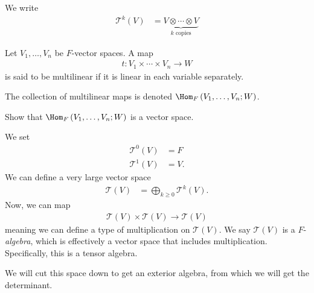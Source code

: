 \documentclass[10pt]{mypackage}
\begin{document}
  We write
  \begin{align*}
    \mathcal{T}^{k}\left(V\right) &= \underbrace{V\otimes \cdots \otimes V}_{\text{$k$ copies}}
  \end{align*}
  \begin{definition}
    Let $V_1,\dots,V_n$ be $F$-vector spaces. A map
    \begin{align*}
      t: V_1\times\cdots\times V_n\rightarrow W
    \end{align*}
    is said to be multilinear if it is linear in each variable separately.\newline

    The collection of multilinear maps is denoted $\Hom_{F}\left(V_1,\dots,V_n;W\right)$.
  \end{definition}
  \begin{exercise}
    Show that $\Hom_{F}\left(V_1,\dots,V_n;W\right)$ is a vector space.
  \end{exercise}
  We set
  \begin{align*}
    \mathcal{T}^{0}(V) &= F\\
    \mathcal{T}^{1}(V) &= V.
  \end{align*}
  We can define a very large vector space
  \begin{align*}
    \mathcal{T}(V) &= \bigoplus_{k\geq 0}\mathcal{T}^{k}(V).
  \end{align*}
  Now, we can map
  \begin{align*}
    \mathcal{T}\left(V\right)\times \mathcal{T}\left(V\right) \rightarrow \mathcal{T}\left(V\right)
  \end{align*}
  meaning we can define a type of multiplication on $\mathcal{T}\left(V\right)$. We say $\mathcal{T}\left(V\right)$ is a $F$-\textit{algebra}, which is effectively a vector space that includes multiplication. Specifically, this is a tensor algebra.\newline

  We will cut this space down to get an exterior algebra, from which we will get the determinant.
\end{document}
